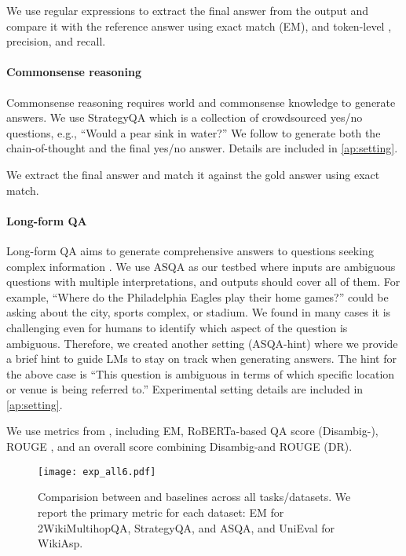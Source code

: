 We use regular expressions to extract the final answer from the output and compare it with the reference answer using exact match (EM), and token-level \fone, precision, and recall.

\paragraph{Commonsense reasoning}
Commonsense reasoning requires world and commonsense knowledge to generate answers.
We use StrategyQA \cite{strategyqa-geva-2021} which is a collection of crowdsourced yes/no questions, e.g., ``Would a pear sink in water?''
We follow \citet{cot-wei-2022} to generate both the chain-of-thought and the final yes/no answer.
Details are included in \autoref{ap:setting}. 

We extract the final answer and match it against the gold answer using exact match.

\paragraph{Long-form QA}
Long-form QA aims to generate comprehensive answers to questions seeking complex information \cite{eli5-fan-2019,asqa-stelmakh-2022}.
We use ASQA \cite{asqa-stelmakh-2022} as our testbed where inputs are ambiguous questions with multiple interpretations, and outputs should cover all of them.
For example, ``Where do the Philadelphia Eagles play their home games?'' could be asking about the city, sports complex, or stadium. 
We found in many cases it is challenging even for humans to identify which aspect of the question is ambiguous.
Therefore, we created another setting (ASQA-hint) where we provide a brief hint to guide LMs to stay on track when generating answers.
The hint for the above case is ``This question is ambiguous in terms of which specific location or venue is being referred to.''
Experimental setting details are included in \autoref{ap:setting}.

We use metrics from \citet{asqa-stelmakh-2022}, including EM, RoBERTa-based QA score (Disambig-\fone), ROUGE \cite{lin-2004-rouge}, and an overall score combining Disambig-\fone and ROUGE (DR).

\begin{figure*}[tb]
\texttt{[image: exp\_all6.pdf]}
\centering
\caption{Comparision between \ours and baselines across all tasks/datasets. We report the primary metric for each dataset: EM for 2WikiMultihopQA, StrategyQA, and ASQA, and UniEval for WikiAsp.}
\label{fig:exp_all}
\end{figure*}

